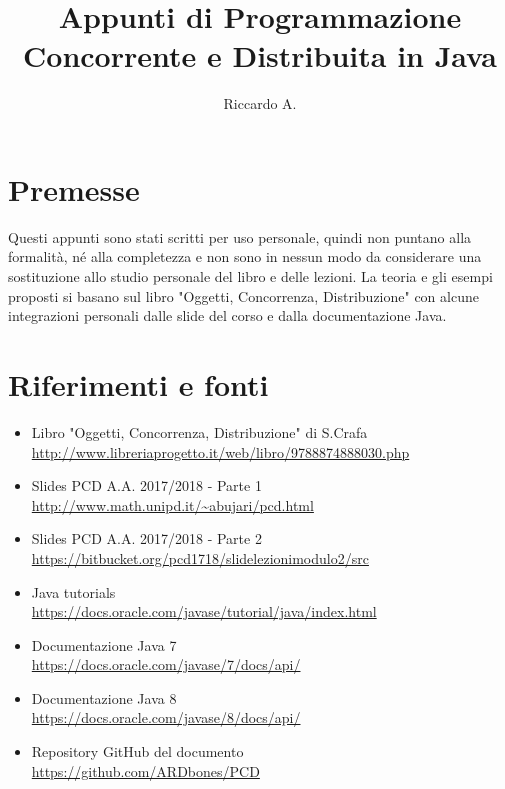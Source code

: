 

\author{Riccardo A.}
\title{\textbf{Appunti di Programmazione \\ Concorrente e Distribuita in Java}}



\maketitle

\section*{Premesse}
Questi appunti sono stati scritti per uso personale, quindi non puntano alla formalità, né alla completezza e non sono in nessun modo da considerare una sostituzione allo studio personale del libro e delle lezioni. La teoria e gli esempi proposti si basano sul libro "Oggetti, Concorrenza, Distribuzione" con alcune integrazioni personali dalle slide del corso e dalla documentazione Java.

\section*{Riferimenti e fonti}
\begin{itemize}
\item Libro "Oggetti, Concorrenza, Distribuzione" di S.Crafa\\
\url{http://www.libreriaprogetto.it/web/libro/9788874888030.php}
\item Slides PCD A.A. 2017/2018 - Parte 1 \\
\url{http://www.math.unipd.it/~abujari/pcd.html}
\item Slides PCD A.A. 2017/2018 - Parte 2 \\
\url{https://bitbucket.org/pcd1718/slidelezionimodulo2/src}
\item Java tutorials \\
\url{https://docs.oracle.com/javase/tutorial/java/index.html}
\item Documentazione Java 7 \\
\url{https://docs.oracle.com/javase/7/docs/api/}
\item Documentazione Java 8 \\
\url{https://docs.oracle.com/javase/8/docs/api/}
\item Repository GitHub del documento \\
\url{https://github.com/ARDbones/PCD}
\end{itemize}

\tableofcontents



